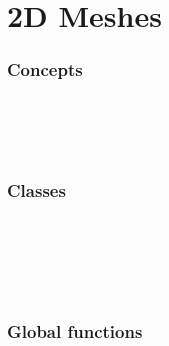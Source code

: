 \newcommand{\meshcdtrequires}{must be instantiated 
by a constrained Delaunay triangulation class.  Such a class can be 
either a plain constrained Delaunay triangulation 
(\ccc{Constrained_Delaunay_triangulation_2<Gt, Tds>}) or a derived 
class such as \ccc{Constrained_triangulation_plus_2<CDT2>} or 
\ccc{Triangulation_hierarchy_2<CDT2>} where \ccc{CDT2} is 
\ccc{Constrained_Delaunay_triangulation_2<Gt, Tds>}.}

\chapter{2D Meshes}


\subsection*{Concepts}
\\
\\
\\
%

\subsection*{Classes}
\\
\\
\\
\\
%

\subsection*{Global functions}
\\
\\
%



